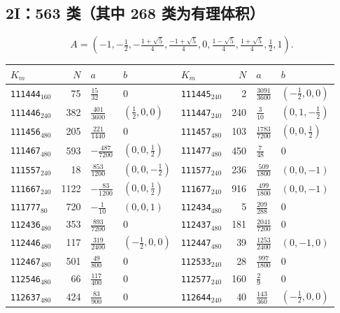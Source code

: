\subsection{2I：563 类（其中 268 类为有理体积）}
\[ A=(-1,-\tfrac12,-\tfrac{1+\sqrt5}{4},\tfrac{-1+\sqrt5}{4},0,\tfrac{1-\sqrt5}{4},\tfrac{1+\sqrt5}{4},\tfrac12,1).\]
{\footnotesize\begin{longtable}{@{}lrll@{\hspace{2em}}lrll@{}}
\toprule
$K_m$ & $N$ & $a$ & $b$ & $K_m$ & $N$ & $a$ & $b$\\\midrule\endhead
\texttt{111444}$_{160}$ & 75 & $\tfrac{15}{32}$ & 0 & \texttt{111445}$_{240}$ & 2 & $\tfrac{3091}{3600}$ & $(-\tfrac{1}{2},0,0)$\\
\texttt{111446}$_{240}$ & 382 & $\tfrac{401}{3600}$ & $(\tfrac{1}{2},0,0)$ & \texttt{111447}$_{240}$ & 240 & $\tfrac{3}{10}$ & $(0,1,-\tfrac{1}{2})$\\
\texttt{111456}$_{480}$ & 205 & $\tfrac{221}{1440}$ & 0 & \texttt{111457}$_{480}$ & 103 & $\tfrac{1783}{7200}$ & $(0,0,\tfrac{1}{2})$\\
\texttt{111467}$_{480}$ & 593 & $-\tfrac{487}{7200}$ & $(0,0,\tfrac{1}{2})$ & \texttt{111477}$_{480}$ & 450 & $\tfrac{7}{48}$ & 0\\
\texttt{111557}$_{240}$ & 18 & $\tfrac{853}{1200}$ & $(0,0,-\tfrac{1}{2})$ & \texttt{111577}$_{240}$ & 236 & $\tfrac{509}{1800}$ & $(0,0,-1)$\\
\texttt{111667}$_{240}$ & 1122 & $-\tfrac{83}{1200}$ & $(0,0,\tfrac{1}{2})$ & \texttt{111677}$_{240}$ & 916 & $\tfrac{499}{1800}$ & $(0,0,-1)$\\
\texttt{111777}$_{80}$ & 720 & $-\tfrac{1}{10}$ & $(0,0,1)$ & \texttt{112434}$_{480}$ & 5 & $\tfrac{209}{288}$ & 0\\
\texttt{112436}$_{480}$ & 353 & $\tfrac{893}{7200}$ & 0 & \texttt{112437}$_{480}$ & 181 & $\tfrac{2041}{7200}$ & 0\\
\texttt{112446}$_{480}$ & 117 & $\tfrac{319}{2400}$ & $(-\tfrac{1}{2},0,0)$ & \texttt{112447}$_{480}$ & 39 & $\tfrac{1253}{2400}$ & $(0,-1,0)$\\
\texttt{112467}$_{480}$ & 501 & $\tfrac{49}{800}$ & 0 & \texttt{112533}$_{240}$ & 28 & $\tfrac{997}{1800}$ & 0\\
\texttt{112546}$_{480}$ & 66 & $\tfrac{117}{400}$ & 0 & \texttt{112577}$_{240}$ & 160 & $\tfrac{2}{9}$ & 0\\
\texttt{112637}$_{480}$ & 424 & $\tfrac{83}{900}$ & 0 & \texttt{112644}$_{240}$ & 40 & $\tfrac{143}{360}$ & $(-\tfrac{1}{2},0,0)$\\

\end{longtable}}
